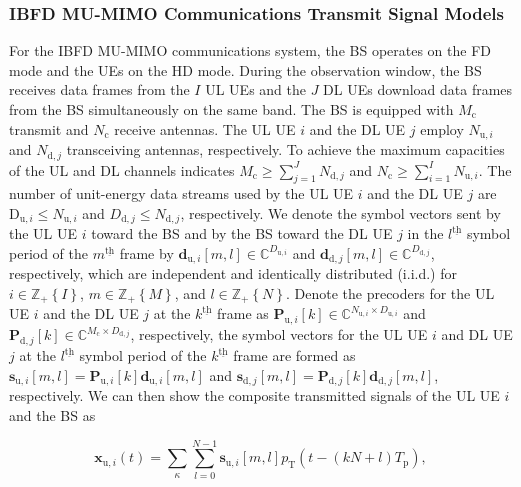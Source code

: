 \documentclass[10pt,journal]{IEEEtran}
\newcommand{\paren}[1]{\left({#1}\right)}
\newcommand{\bracket}[1]{{\left [{#1}\right ]}}
\newcommand{\braces}[1]{{\left\{ {#1}\right\}}}
\newcommand{\ith}[1]    {{#1}^{\underline{\text{th}}}}
\newcommand{\cc}{_\mathrm{c}}
\newcommand{\PiB}{\mathbf{P}_{\textrm{u},i}\bracket{k}}
\newcommand{\PBj}{\mathbf{P}_{\textrm{d},j}\bracket{k}}
\theoremstyle{definition}
\begin{document}
	\subsubsection{IBFD MU-MIMO Communications Transmit Signal Models}
	For the IBFD MU-MIMO communications system, the BS operates on the FD mode and the UEs on the HD mode.  During the observation window, the BS receives data frames from the $I$ UL UEs and the $J$ DL UEs download data frames from the BS simultaneously on the same band. The BS is equipped with $\mathit{M}_\mathrm{c}$ transmit and $\mathit{N}_{\mathrm{c}}$ receive antennas. The UL UE $i$ and the DL UE $j$ employ $\mathit{N}_{\mathrm{u},i}$ and $\mathit{N}_{\mathrm{d},j}$ transceiving antennas, respectively. To achieve the maximum capacities of the UL and DL channels indicates $\mathit{M}\cc\geq\sum_{j=1}^{\mathit{J}}\mathit{N}_{\textrm{d},j}$ and $\mathit{N}\cc\geq\sum_{i=1}^{\mathit{I}}\mathit{N}_{\textrm{u},i}$\cite{tse2005fundamentals}. %
	The number of unit-energy data streams used by the UL UE $i$ and the DL UE $j$ are $\mathrm{D}_{\textrm{u},i}\leq \mathit{N}_{\mathrm{u},i}$ and $\mathit{D}_{\mathrm{d},j}\leq \mathit{N}_{\mathrm{d},j}$, respectively. We denote the symbol vectors sent by the UL UE $i$ toward the BS and by the BS toward the DL UE $j$ in the  $\ith{l}$ symbol period of the $\ith{m}$ frame by $\mathbf{d}_{\mathrm{u},i}\bracket{m,l}\in \mathbb{C}^{D_{\textrm{u},i}}$ and $\mathbf{d}_{\mathrm{d},j}\bracket{m,l}\in \mathbb{C}^{\mathit{D}_{\mathrm{d},j}}$, respectively, which are independent and identically distributed (i.i.d.) for $i\in\mathbb{Z}_+\braces{\mathit{I}}$, $m\in\mathbb{Z}_+\braces{\mathit{M}}$, and $l\in\mathbb{Z}_+\braces{\mathit{N}}$. 
	Denote the precoders for the UL UE $i$ and the DL UE $j$ at the $\ith{k}$ frame as $\PiB\in\mathbb{C}^{\mathit{N}_{\mathrm{u},i}\times \mathit{D}_{\mathrm{u},i}}$ and $\PBj\in\mathbb{C}^{\mathit{M}\cc\times \mathit{D}_{\mathrm{d},j}}$, respectively, the symbol vectors for the UL UE $i$ and DL UE $j$ at the $\ith{l}$ symbol period of the $\ith{k}$ frame are formed as $\mathbf{s}_{\textrm{u},i}\bracket{m,l}=\PiB\mathbf{d}_{\mathrm{u},i}\bracket{m,l}$ and $\mathbf{s}_{\textrm{d},j}\bracket{m,l}=\PBj\mathbf{d}_{\mathrm{d},j}\bracket{m,l}$, respectively. \color{red}We can then show the composite transmitted signals of the UL UE $i$ and the BS as\par\noindent\small
	\begin{equation}
		\mathbf{x}_{\mathrm{u},i}\paren{t}=\sum_{\kappa}^{}\sum_{l=0}^{N-1}\mathbf{s}_{\mathrm{u},i}\bracket{m,l}p_{\mathrm{T}}\paren{t-(kN+l)T_{\mathrm{p}}},    
	\end{equation}
\end{document}
